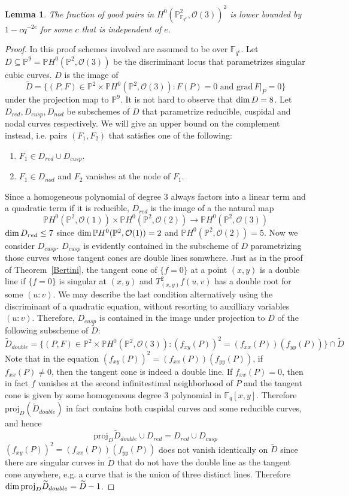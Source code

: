 \documentclass[12pt]{article}
\theoremstyle{plain}
\newtheorem{lemma}[equation]{Lemma}
\theoremstyle{definition}
\newcommand{\IF}{\mathbb{F}}
\newcommand{\IP}{\mathbb{P}}
\newcommand{\sO}{\mathcal{O}}
\renewcommand\dim{{\rm dim\,}}
\newcommand{\<}{\langle}
\renewcommand{\>}{\rangle}
\def\wt{\widetilde}
\newcommand{\grad}{\mathrm{grad}\,}
\newcommand{\proj}{\mathrm{proj}}
\begin{document}
\begin{lemma}
\label{pcount}
The fraction of good pairs in $H^0(\IP^2_{\IF_{q^e}}, \sO(3))^2$ is lower bounded by $1 - c q^{-2e}$ for some $c$ that is independent of $e$. 
\end{lemma}
\begin{proof}
In this proof schemes involved are assumed to be over $\IF_{q^e}$. Let $D \subseteq \IP^9 = \IP H^0(\IP^2, \sO(3))$ be the discriminant locus that parametrizes singular cubic curves. $D$ is the image of 
$$ \wt{D} = \{ (P, F) \in \IP^2 \times \IP H^0(\IP^2, \sO(3)) : F(P) =0 \text{ and } \grad F|_P = 0 \}$$ under the projection map to $\IP^9$. It is not hard to observe that $\dim D = 8$. Let $D_{red}, D_{cusp}, D_{nod}$ be subschemes of $D$ that parametrize reducible, cuspidal and nodal curves respectively. We will give an upper bound on the complement instead, i.e. pairs $(F_1, F_2)$ that satisfies one of the following:
\begin{enumerate}
\item $F_1 \in D_{red} \cup D_{cusp}$.
\item $F_1 \in D_{nod}$ and $F_2$ vanishes at the node of $F_1$.
\end{enumerate}
Since a homogeneous polynomial of degree $3$ always factors into a linear term and a quadratic term if it is reducible, $D_{red}$ is the image of a the natural map 
$$ \IP H^0(\IP^2, \sO(1)) \times \IP H^0(\IP^2, \sO(2)) \to \IP H^0(\IP^2, \sO(3))$$
$\dim D_{red} \le 7$ since $\dim \IP H^0(\IP^2, \sO(1)) = 2$ and $\IP H^0(\IP^2, \sO(2)) = 5$. Now we consider $D_{cusp}$. $D_{cusp}$ is evidently contained in the subscheme of $D$ parametrizing those curves whose tangent cones are double lines somwhere. Just as in the proof of Theorem~\ref{Bertini}, the tangent cone of $\{f=0\}$ at a point $(x, y)$ is a double line if $\{f=0\}$ is singular at $(x, y)$ and $T^2_{(x, y)}f(u, v)$ has a double root for some $(u : v)$. We may describe the last condition alternatively using the discriminant of a quadratic equation, without resorting to auxilliary variables $(u : v)$. Therefore, $D_{cusp}$ is contained in the image under projection to $D$ of the following subscheme of $\wt{D}$:
$$ \wt{D}_{double} = \{ (P, F) \in \IP^2 \times \IP H^0(\IP^2, \sO(3)) : (f_{xy}(P))^2 = (f_{xx}(P))(f_{yy}(P))\} \cap \wt{D}$$
Note that in the equation $(f_{xy}(P))^2 = (f_{xx}(P))(f_{yy}(P))$, if $f_{xx}(P) \neq 0$, then the tangent cone is indeed a double line. If $f_{xx}(P) = 0$, then in fact $f$ vanishes at the second infinitestimal neighborhood of $P$ and the tangent cone is given by some homogeneous degree $3$ polynomial in $\IF_q[x, y]$. Therefore $\proj_D(\wt{D}_{double})$ in fact contains both cuspidal curves and some reducible curves, and hence $$\proj_D{\wt{D}_{double}} \cup D_{red} = D_{red} \cup D_{cusp}$$
$(f_{xy}(P))^2 = (f_{xx}(P))(f_{yy}(P))$ does not vanish identically on $\wt{D}$ since there are singular curves in $\wt{D}$ that do not have the double line as the tangent cone anywhere, e.g. a curve that is the union of three distinct lines. Therefore $\dim \proj_D{\wt{D}_{double}} = \wt{D} - 1$.



\end{proof}
\end{document}
